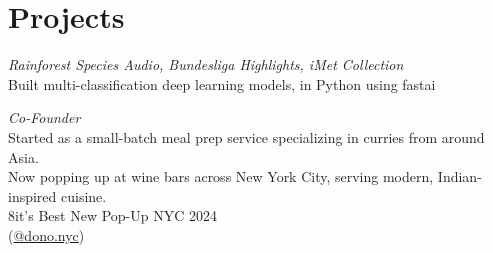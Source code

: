 \documentclass[a4paper]{deedy-resume-openfont} %
\begin{document}
\begin{minipage}[t]{0.33\textwidth}





\section{Projects}
\textit{ Rainforest Species Audio, Bundesliga Highlights, iMet Collection}\\
Built multi-classification deep learning models, in Python using fastai
\sectionsep

\textit{Co-Founder}\\
Started as a small-batch meal prep service specializing in curries from around Asia.\\
Now popping up at wine bars across New York City, serving modern, Indian-inspired cuisine.\\
8it’s Best New Pop-Up NYC 2024\\(\href{https://www.instagram.com/dono.nyc/}{@dono.nyc})



\end{minipage}
\end{document}
